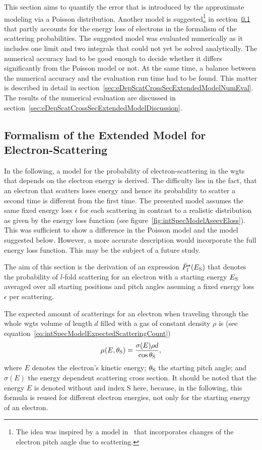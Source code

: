 This section aims to quantify the error that is introduced by the approximate modeling via a Poisson distribution. Another model is suggested\footnote{The idea was inspired by a model in~\cite{Groh2015} that incorporates changes of the electron pitch angle due to scattering.} in section~\ref{sec:eDepScatCrossSecExtendedModelFormalism} that partly accounts for the energy loss of electrons in the formalism of the scattering probabilities. The suggested model was evaluated numerically as it includes one limit and two integrals that could not yet be solved analytically. The numerical accuracy had to be good enough to decide whether it differs significantly from the Poisson model or not. At the same time, a balance between the numerical accuracy and the evaluation run time had to be found. This matter is described in detail in section~\ref{sec:eDepScatCrossSecExtendedModelNumEval}. The results of the numerical evaluation are discussed in section~\ref{sec:eDepScatCrossSecExtendedModelDiscussion}.

\subsection{Formalism of the Extended Model for Electron-Scattering}
\label{sec:eDepScatCrossSecExtendedModelFormalism}
In the following, a model for the probability of electron-scattering in the \gls{wgts} that depends on the electron energy is derived. The difficulty lies in the fact, that an electron that scatters loses energy and hence its probability to scatter a second time is different from the first time. The presented model assumes the same fixed energy loss $\epsilon$ for each scattering in contrast to a realistic distribution as given by the energy loss function (see figure~\ref{fig:intSpecModelAseevEloss}). This was sufficient to show a difference in the Poisson model and the model suggested below. However, a more accurate description would incorporate the full energy loss function. This may be the subject of a future study. 

The aim of this section is the derivation of an expression $\bar{P}^{\star}_l(E_\mathrm{S})$ that denotes the probability of $l$-fold scattering for an electron with a starting energy $E_\mathrm{S}$ averaged over all starting positions and pitch angles assuming a fixed energy loss $\epsilon$ per scattering.

The expected amount of scatterings for an electron when traveling through the whole \gls{wgts} volume of length $d$ filled with a gas of constant density $\rho$ is (see equation~\ref{eq:intSpecModelExpectedScatteringCount})
\begin{equation}
\label{eq:eDepScatCrossSecExtendedModelFormalismExpectedScatCount}
\mu(E,\theta_\mathrm{S}) =
\frac{\sigma(E)\rho d}{\cos\theta_\mathrm{S}},
\end{equation}
where $E$ denotes the electron's kinetic energy; $\theta_\mathrm{S}$ the starting pitch angle; and $\sigma(E)$ the energy dependent scattering cross section. It should be noted that the energy $E$ is denoted without and index S here, because, in the following, this formula is reused for different electron energies, not only for the starting energy of an electron.

